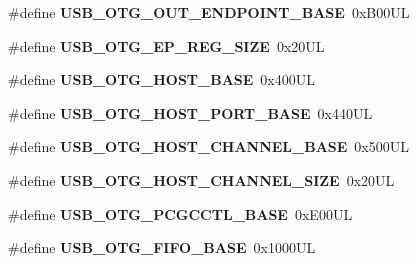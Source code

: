 \begin{DoxyCompactItemize}
\item 
\mbox{\label{group___peripheral__memory__map_gaf0e972b8f028ecf44a652029efbd4642}} 
\#define {\bfseries U\+S\+B\+\_\+\+O\+T\+G\+\_\+\+O\+U\+T\+\_\+\+E\+N\+D\+P\+O\+I\+N\+T\+\_\+\+B\+A\+SE}~0x\+B00\+UL
\item 
\mbox{\label{group___peripheral__memory__map_ga6fdb7429ad88e2d69440d6ecc4f4199e}} 
\#define {\bfseries U\+S\+B\+\_\+\+O\+T\+G\+\_\+\+E\+P\+\_\+\+R\+E\+G\+\_\+\+S\+I\+ZE}~0x20\+UL
\item 
\mbox{\label{group___peripheral__memory__map_ga3bb2dd6c82eefd8587b6146ba36ae071}} 
\#define {\bfseries U\+S\+B\+\_\+\+O\+T\+G\+\_\+\+H\+O\+S\+T\+\_\+\+B\+A\+SE}~0x400\+UL
\item 
\mbox{\label{group___peripheral__memory__map_ga42f433cb79ca69f09972e690fda6737a}} 
\#define {\bfseries U\+S\+B\+\_\+\+O\+T\+G\+\_\+\+H\+O\+S\+T\+\_\+\+P\+O\+R\+T\+\_\+\+B\+A\+SE}~0x440\+UL
\item 
\mbox{\label{group___peripheral__memory__map_ga942c8c5241b80fbcf638fea0fa18bebd}} 
\#define {\bfseries U\+S\+B\+\_\+\+O\+T\+G\+\_\+\+H\+O\+S\+T\+\_\+\+C\+H\+A\+N\+N\+E\+L\+\_\+\+B\+A\+SE}~0x500\+UL
\item 
\mbox{\label{group___peripheral__memory__map_ga266cb1dbb50faf447f9c15d2ee93a522}} 
\#define {\bfseries U\+S\+B\+\_\+\+O\+T\+G\+\_\+\+H\+O\+S\+T\+\_\+\+C\+H\+A\+N\+N\+E\+L\+\_\+\+S\+I\+ZE}~0x20\+UL
\item 
\mbox{\label{group___peripheral__memory__map_gaa9766975aca084c257730879568bc7cf}} 
\#define {\bfseries U\+S\+B\+\_\+\+O\+T\+G\+\_\+\+P\+C\+G\+C\+C\+T\+L\+\_\+\+B\+A\+SE}~0x\+E00\+UL
\item 
\mbox{\label{group___peripheral__memory__map_gace340350802904868673f0e839c4fa04}} 
\#define {\bfseries U\+S\+B\+\_\+\+O\+T\+G\+\_\+\+F\+I\+F\+O\+\_\+\+B\+A\+SE}~0x1000\+UL
\item 
\mbox{\label{group___peripheral__memory__map_ga8781c4b2406c740d9fe540737a6a0188}} 

\end{DoxyCompactItemize}

